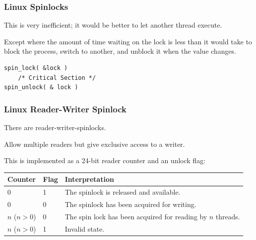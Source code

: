 \begin{frame}[fragile]
\frametitle{Linux Spinlocks}

This is very inefficient; it would be better to let another thread execute.

Except where the amount of time waiting on the lock is less than it would take to block the process, switch to another, and unblock it when the value changes.

\begin{verbatim}
spin_lock( &lock )
    /* Critical Section */
spin_unlock( & lock )
\end{verbatim}

\end{frame}

\begin{frame}
\frametitle{Linux Reader-Writer Spinlock}

There are \alert{reader-writer-spinlocks}. 

Allow multiple readers but give exclusive access to a writer. 

This is implemented as a 24-bit reader counter and an unlock flag:
\begin{center}
\begin{tabular}{l|l|l}
	\textbf{Counter} & \textbf{Flag} & \textbf{Interpretation}\\\hline
	0 & 1 & The spinlock is released and available. \\
	0 & 0 & The spinlock has been acquired for writing.\\
	$n$ ($n > 0$) & 0 & The spin lock has been acquired for reading by $n$ threads.\\
	$n$ ($n > 0$) & 1 & Invalid state.\\
\end{tabular}
\end{center}

\end{frame}



